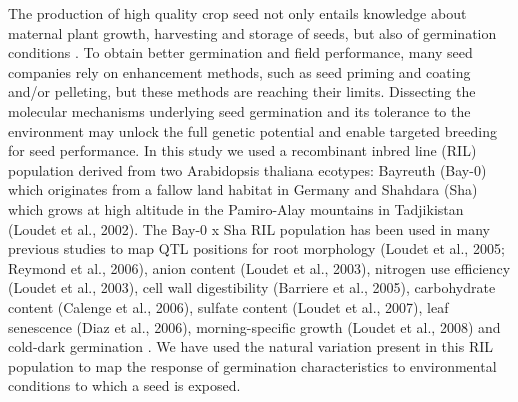 \documentclass[8pt, twoside, a5paper]{report}
\begin{document}
The production of high quality crop seed not only entails knowledge about maternal plant growth, harvesting and storage of seeds, 
but also of germination conditions \cite{Rivero-Lepinckas:2006}. To obtain better germination and field performance, many seed 
companies rely on enhancement methods, such as seed priming and coating and/or pelleting, but these methods are reaching their 
limits. Dissecting the molecular mechanisms underlying seed germination and its tolerance to the environment may unlock the full 
genetic potential and enable targeted breeding for seed performance. In this study we used a recombinant inbred line (RIL) population 
derived from two Arabidopsis thaliana ecotypes: Bayreuth (Bay-0) which originates from a fallow land habitat in Germany and Shahdara 
(Sha) which grows at high altitude in the Pamiro-Alay mountains in Tadjikistan (Loudet et al., 2002). The Bay-0 x Sha RIL population 
has been used in many previous studies to map QTL positions for root morphology (Loudet et al., 2005; Reymond et al., 2006), anion 
content (Loudet et al., 2003), nitrogen use efficiency (Loudet et al., 2003), cell wall digestibility (Barriere et al., 2005), 
carbohydrate content (Calenge et al., 2006), sulfate content (Loudet et al., 2007), leaf senescence (Diaz et al., 2006), 
morning-specific growth (Loudet et al., 2008) and cold-dark germination \cite{Meng:2008}. We have used the natural variation 
present in this RIL population to map the response of germination characteristics to environmental conditions to which a seed is exposed.
\end{document}
